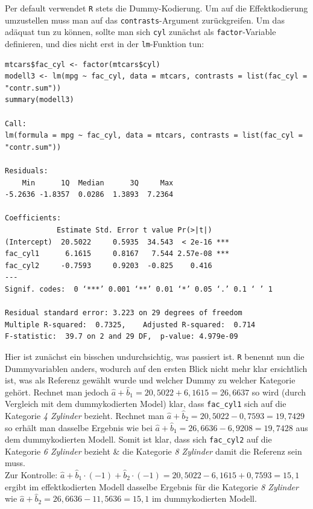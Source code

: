 \documentclass[a4paper]{article}
\newcommand\dangersign[1][2ex]{%
  \renewcommand\stacktype{L}%
  \scaleto{\stackon[1.3pt]{\color{red}$\triangle$}{\tiny !}}{#1}%
}
\begin{document}
\noindent \dangersign[3ex] Per default verwendet \texttt{R} stets die Dummy-Kodierung. Um auf die Effektkodierung umzustellen muss man auf das \texttt{contrasts}-Argument zurückgreifen. Um das adäquat tun zu können, sollte man sich \texttt{cyl} zunächst als \texttt{factor}-Variable definieren, und dies nicht erst in der \texttt{lm}-Funktion tun:\\

\begin{small}
\begin{Verbatim}[frame=single]
mtcars$fac_cyl <- factor(mtcars$cyl)
modell3 <- lm(mpg ~ fac_cyl, data = mtcars, contrasts = list(fac_cyl = "contr.sum"))
summary(modell3)

Call:
lm(formula = mpg ~ fac_cyl, data = mtcars, contrasts = list(fac_cyl = "contr.sum"))

Residuals:
    Min      1Q  Median      3Q     Max 
-5.2636 -1.8357  0.0286  1.3893  7.2364 

Coefficients:
            Estimate Std. Error t value Pr(>|t|)    
(Intercept)  20.5022     0.5935  34.543  < 2e-16 ***
fac_cyl1      6.1615     0.8167   7.544 2.57e-08 ***
fac_cyl2     -0.7593     0.9203  -0.825    0.416    
---
Signif. codes:  0 ‘***’ 0.001 ‘**’ 0.01 ‘*’ 0.05 ‘.’ 0.1 ‘ ’ 1

Residual standard error: 3.223 on 29 degrees of freedom
Multiple R-squared:  0.7325,	Adjusted R-squared:  0.714 
F-statistic:  39.7 on 2 and 29 DF,  p-value: 4.979e-09
\end{Verbatim}
\end{small}
Hier ist zunächst ein bisschen undurchsichtig, was passiert ist. \texttt{R} benennt nun die Dummyvariablen anders, wodurch auf den ersten Blick nicht mehr klar ersichtlich ist, was als Referenz gewählt wurde und welcher Dummy zu welcher Kategorie gehört. Rechnet man jedoch $\hat a + \hat b_1 = 20,5022 + 6,1615 = 26,6637$ so wird (durch Vergleich mit dem dummykodierten Model) klar, dass \texttt{fac\_cyl1} sich auf die Kategorie \textit{4 Zylinder} bezieht. Rechnet man $\hat a + \hat b_2 = 20,5022 - 0,7593 = 19,7429$ so erhält man dasselbe Ergebnis wie bei $\hat a + \hat b_1 = 26,6636 - 6,9208 = 19,7428$ aus dem dummykodierten Modell. Somit ist klar, dass sich \texttt{fac\_cyl2} auf die Kategorie \textit{6 Zylinder} bezieht \& die Kategorie \textit{8 Zylinder} damit die Referenz sein muss.\\
Zur Kontrolle: $\hat a + \hat b_1 \cdot (-1) + \hat b_2 \cdot (-1) = 20,5022 - 6,1615 + 0,7593 = 15,1$ ergibt im effektkodierten Modell dasselbe Ergebnis für die Kategorie \textit{8 Zylinder} wie $\hat a + \hat b_2 = 26,6636 - 11,5636 = 15,1$ im dummykodierten Modell. 
\end{document}
